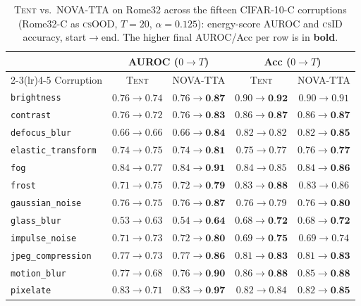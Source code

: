 \documentclass[11pt]{article}
\newcommand{\csid}{\textsc{cs}ID}
\newcommand{\csood}{\textsc{cs}OOD}
\newcommand{\method}[1]{\textsc{#1}}
\begin{document}
\begin{table}[t]
  \centering
  \small
  \caption{\method{Tent} vs.\ \method{NOVA-TTA} on Rome32 across the fifteen
  CIFAR-10-C corruptions (Rome32-C as \csood, $T{=}20$, $\alpha{=}0.125$):
  energy-score AUROC and \csid{} accuracy, start$\to$end. The higher final
  AUROC/Acc per row is in \textbf{bold}.}
  \label{tab:rome32-corruptions}
  \begin{tabular}{lcccc}
    \toprule
    & \multicolumn{2}{c}{AUROC ($0\to T$)} & \multicolumn{2}{c}{Acc ($0\to T$)}\\
    \cmidrule(lr){2-3}\cmidrule(lr){4-5}
    Corruption & \method{Tent} & \method{NOVA-TTA} & \method{Tent} & \method{NOVA-TTA}\\
    \midrule
    \texttt{brightness}         & $0.76\to0.74$ & $0.76\to\textbf{0.87}$ & $0.90\to\textbf{0.92}$ & $0.90\to0.91$\\
    \texttt{contrast}           & $0.76\to0.72$ & $0.76\to\textbf{0.83}$ & $0.86\to\textbf{0.87}$ & $0.86\to\textbf{0.87}$\\
    \texttt{defocus\_blur}      & $0.66\to0.66$ & $0.66\to\textbf{0.84}$ & $0.82\to0.82$ & $0.82\to\textbf{0.85}$\\
    \texttt{elastic\_transform} & $0.74\to0.75$ & $0.74\to\textbf{0.81}$ & $0.75\to0.77$ & $0.76\to\textbf{0.77}$\\
    \texttt{fog}                & $0.84\to0.77$ & $0.84\to\textbf{0.91}$ & $0.84\to0.85$ & $0.84\to\textbf{0.86}$\\
    \texttt{frost}              & $0.71\to0.75$ & $0.72\to\textbf{0.79}$ & $0.83\to\textbf{0.88}$ & $0.83\to0.86$\\
    \texttt{gaussian\_noise}    & $0.76\to0.75$ & $0.76\to\textbf{0.87}$ & $0.76\to0.79$ & $0.76\to\textbf{0.80}$\\
    \texttt{glass\_blur}        & $0.53\to0.63$ & $0.54\to\textbf{0.64}$ & $0.68\to\textbf{0.72}$ & $0.68\to\textbf{0.72}$\\
    \texttt{impulse\_noise}     & $0.71\to0.73$ & $0.72\to\textbf{0.80}$ & $0.69\to\textbf{0.75}$ & $0.69\to0.74$\\
    \texttt{jpeg\_compression}  & $0.77\to0.73$ & $0.77\to\textbf{0.86}$ & $0.81\to\textbf{0.83}$ & $0.81\to\textbf{0.83}$\\
    \texttt{motion\_blur}       & $0.77\to0.68$ & $0.76\to\textbf{0.90}$ & $0.86\to\textbf{0.88}$ & $0.85\to\textbf{0.88}$\\
    \texttt{pixelate}           & $0.83\to0.71$ & $0.83\to\textbf{0.97}$ & $0.82\to0.84$ & $0.82\to\textbf{0.85}$\\

\end{tabular}
\end{table}
\end{document}
